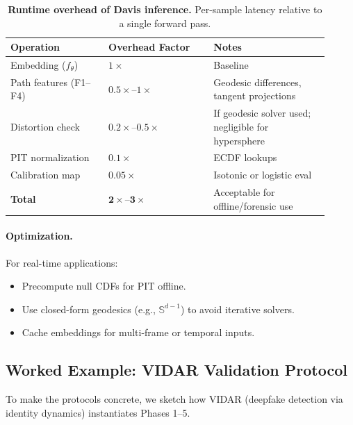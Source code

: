 \documentclass[11pt]{article}
\begin{document}
\begin{table}[H]
\centering
\caption{\textbf{Runtime overhead of Davis inference.} Per-sample latency relative to a single forward pass.}
\label{tab:inference-costs}
\begin{tabularx}{\linewidth}{@{}p{0.28\linewidth}p{0.30\linewidth}p{0.33\linewidth}@{}}
\toprule
\textbf{Operation} & \textbf{Overhead Factor} & \textbf{Notes} \\
\midrule
Embedding ($f_\theta$) & $1\times$ & Baseline \\
Path features (F1--F4) & $0.5\times$--$1\times$ & Geodesic differences, tangent projections \\
Distortion check & $0.2\times$--$0.5\times$ & If geodesic solver used; negligible for hypersphere \\
PIT normalization & $0.1\times$ & ECDF lookups \\
Calibration map & $0.05\times$ & Isotonic or logistic eval \\
\midrule
\textbf{Total} & $\mathbf{2\times}$--$\mathbf{3\times}$ & Acceptable for offline/forensic use \\
\bottomrule
\end{tabularx}
\end{table}

\paragraph{Optimization.}
For real-time applications:
\begin{itemize}[leftmargin=*]
  \item Precompute null CDFs for PIT offline.
  \item Use closed-form geodesics (e.g., $\mathbb{S}^{d-1}$) to avoid iterative solvers.
  \item Cache embeddings for multi-frame or temporal inputs.
\end{itemize}

\subsection{Worked Example: VIDAR Validation Protocol}
\label{subsec:vidar-example}

To make the protocols concrete, we sketch how VIDAR (deepfake detection via identity dynamics) instantiates Phases 1--5.
\end{document}
